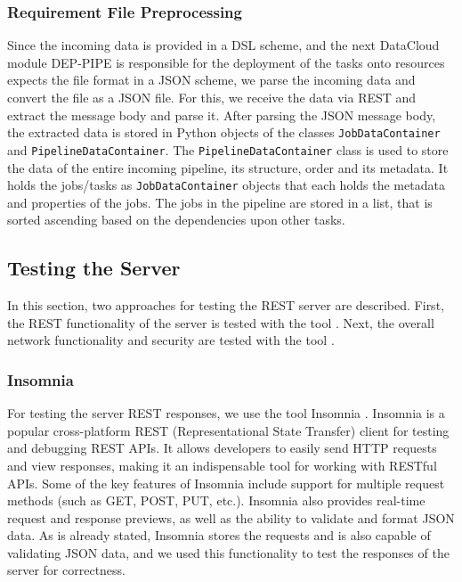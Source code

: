 \documentclass{article}
\begin{document}
            \subsubsection{Requirement File Preprocessing}
            \label{sec:requirement-file-preprocessing-server}

                Since the incoming data is provided in a DSL scheme, and the next DataCloud module DEP-PIPE is responsible for the deployment of the tasks onto resources expects the file format in a JSON scheme, we parse the incoming data and convert the file as a JSON file. For this, we receive the data via REST and extract the message body and parse it.
                After parsing the JSON message body, the extracted data is stored in Python objects of the classes \texttt{JobDataContainer} and \texttt{PipelineDataContainer}. 
                The \texttt{PipelineDataContainer} class is used to store the data of the entire incoming pipeline, its structure, order and its metadata. It holds the jobs/tasks as \texttt{JobDataContainer} objects that each holds the metadata and properties of the jobs.
                The jobs in the pipeline are stored in a list, that is sorted ascending based on the dependencies upon other tasks.


        \subsection{Testing the Server}
        \label{sec:testing-the-server}

            In this section, two approaches for testing the REST server are described.
            First, the REST functionality of the server is tested with the tool . Next, the overall network functionality and security are tested with the tool .

            \subsubsection*{Insomnia}
            \label{sec:insomnia-server}
            
                For testing the server REST responses, we use the tool Insomnia \cite{konginc.IntroductionInsomnia}.
                Insomnia is a popular cross-platform REST (Representational State Transfer) client for testing and debugging REST APIs. It allows developers to easily send HTTP requests and view responses, making it an indispensable tool for working with RESTful APIs. Some of the key features of Insomnia include support for multiple request methods (such as GET, POST, PUT, etc.). Insomnia also provides real-time request and response previews, as well as the ability to validate and format JSON data.
                As is already stated, Insomnia stores the requests and is also capable of validating JSON data, and we used this functionality to test the responses of the server for correctness.
\end{document}
